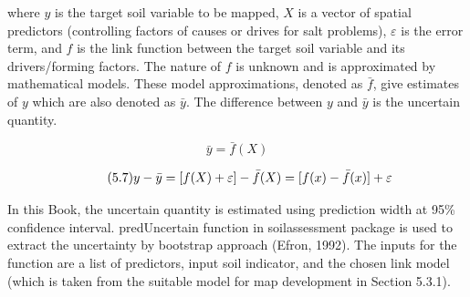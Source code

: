\documentclass[
  10pt,
  b5paper,
]{book}
\begin{document}
where \(y\) is the target soil variable to be mapped, \(X\) is a vector of spatial predictors (controlling factors of causes or drives for salt problems), \(\varepsilon\) is the error term, and \(f\) is the link function between the target soil variable and its drivers/forming factors. The nature of \(f\) is unknown and is approximated by mathematical models. These model approximations, denoted as \(\bar{f}\), give estimates of \(y\) which are also denoted as \(\bar{y}\). The difference between \(y\) and \(\bar{y}\) is the uncertain quantity.

\begin{equation}
\tag{5.6}
\bar{y} = \bar{f}(X)
\end{equation}

\begin{equation}
\tag{5.7}
y - \bar{y} = [f(X) + \varepsilon] - \bar{f}(X)\\
= [f(x) -\bar{f}(x)]+ \varepsilon
\end{equation}

In this Book, the uncertain quantity is estimated using prediction width at 95\% confidence interval. predUncertain function in soilassessment package is used to extract the uncertainty by bootstrap approach (Efron, 1992). The inputs for the function are a list of predictors, input soil indicator, and the chosen link model (which is taken from the suitable model for map development in Section 5.3.1).
\end{document}

